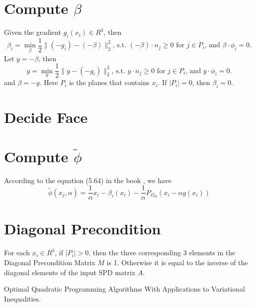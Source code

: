 \documentclass[9pt,twocolumn]{extarticle}
\begin{document}
\section{Compute $\beta$}
Given the gradient $g_i(x_i)\in R^3$, then
\begin{equation} 
  \beta_i = \min_{\beta} \frac{1}{2}\|(-g_i)-(-\beta)\|_2^2 \mbox{, s.t. } (-\beta) \cdot n_j \ge 0 \mbox{ for } j\in P_i \mbox{, and } \beta \cdot \phi_i=0.
\end{equation}
Let $y = -\beta$, then
\begin{equation} 
  y = \min_{y} \frac{1}{2}\|y-(-g_i)\|_2^2 \mbox{, s.t. } y \cdot n_j \ge 0 \mbox{ for } j\in P_i \mbox{, and } y \cdot \phi_i=0.
\end{equation}
and $\beta = -y$. Here $P_i$ is the planes that contains $x_i$. If $|P_i|=0$, then $\beta_i=0$.

\section{Decide Face}


\section{Compute $\tilde{\phi}$}
According to the equation (5.64) in the book \cite{book}, we have
\begin{equation}
  \tilde{\phi}(x_j,{\alpha}) = \frac{1}{\alpha}x_i-\beta_i(x_i)-\frac{1}{\alpha} P_{\Omega_B}(x_i-\alpha g(x_i))
\end{equation}

\section{Diagonal Precondition}
For each $x_i\in R^{3}$, if $|P_i| > 0$, then the three corresponding $3$ elements in the Diagonal Precondition Matrix $M$ is 1. Otherwise it is equal to the inverse of the diagonal elements of the input SPD matrix $A$.

\begin{thebibliography}{99}
 Optimal Quadratic Programming Algorithms With Applications to Variational Inequalities.
\end{thebibliography}
\end{document}
